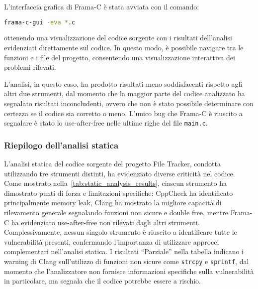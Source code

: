 L'interfaccia grafica di Frama-C è stata avviata con il comando:
\begin{lstlisting}[language=bash, numbers=none]
frama-c-gui -eva *.c
\end{lstlisting}
ottenendo una visualizzazione del codice sorgente con i risultati dell'analisi
evidenziati direttamente sul codice. In questo modo, è possibile navigare tra le
funzioni e i file del progetto, consentendo una visualizzazione interattiva dei problemi
rilevati.

L'analisi, in questo caso, ha prodotto risultati meno soddisfacenti rispetto agli
altri due strumenti, dal momento che la maggior parte del codice analizzato ha
segnalato risultati inconcludenti, ovvero che non è stato possibile determinare con
certezza se il codice sia corretto o meno. L'unico bug che Frama-C è riuscito a
segnalare è stato lo use-after-free nelle ultime righe del file \texttt{main.c}.

\subsubsection*{Riepilogo dell'analisi statica}
L'analisi statica del codice sorgente del progetto File Tracker, condotta
utilizzando tre strumenti distinti, ha evidenziato diverse criticità nel codice.
Come mostrato nella~\autoref{tab:static_analysis_results}, ciascun strumento ha dimostrato
punti di forza e limitazioni specifiche: CppCheck ha identificato principalmente
memory leak, Clang ha mostrato la migliore capacità di rilevamento generale segnalando
funzioni non sicure e double free, mentre Frama-C ha evidenziato use-after-free
non rilevati dagli altri strumenti. Complessivamente, nessun singolo strumento è
riuscito a identificare tutte le vulnerabilità presenti, confermando l'importanza
di utilizzare approcci complementari nell'analisi statica. I risultati ``Parziale''
nella tabella indicano i warning di Clang sull'utilizzo di funzioni non sicure
come \texttt{strcpy} e \texttt{sprintf}, dal momento che l'analizzatore non fornisce
informazioni specifiche sulla vulnerabilità in particolare, ma segnala che il
codice potrebbe essere a rischio.

